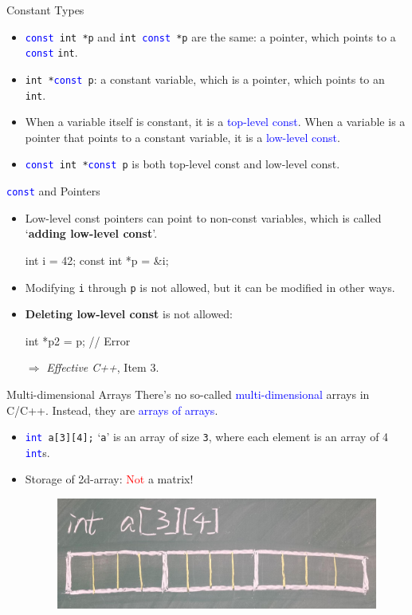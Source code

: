 \documentclass{beamer}
\newcommand{\red}[1]{\textcolor{red}{#1}}
\newcommand{\blue}[1]{\textcolor{blue}{#1}}
\newcommand{\ttt}[1]{\texttt{#1}}
\newcommand{\bluett}[1]{\blue{\ttt{#1}}}
\begin{document}
\begin{frame}{Constant Types}
	\begin{itemize}
		\item \bluett{const }\ttt{int *p} and \ttt{int }\bluett{const }\ttt{*p} are the same: a pointer, which points to a \bluett{const} \ttt{int}.
		\item \ttt{int *}\bluett{const }\ttt{p}: a constant variable, which is a pointer, which points to an \ttt{int}.
		\pause
		\item When a variable itself is constant, it is a \blue{top-level const}. When a variable is a pointer that points to a constant variable, it is a \blue{low-level const}.
		\item \bluett{const }\ttt{int *}\bluett{const }\ttt{p} is both top-level const and low-level const.
	\end{itemize}
\end{frame}

\begin{frame}[fragile]{\bluett{const} and Pointers}
	\begin{itemize}
		\item Low-level const pointers can point to non-const variables, which is called `\textbf{adding low-level const}'.
		\begin{cpp}
int i = 42;
const int *p = &i;
		\end{cpp}
		\item Modifying \ttt{i} through \ttt{p} is not allowed, but it can be modified in other ways.
		\pause
		\item \textbf{Deleting low-level const} is not allowed:
		\begin{cpp}
int *p2 = p; // Error
		\end{cpp}
		\pause
		\item[\(\Rightarrow\)] \textit{Effective C++}, Item 3.
	\end{itemize}
\end{frame}

\begin{frame}{Multi-dimensional Arrays}
	There's no so-called \blue{multi-dimensional} arrays in C/C++. Instead, they are \blue{arrays of arrays}.
	\begin{itemize}
		\item \bluett{int }\ttt{a[3][4];} `\ttt{a}' is an array of size \ttt{3}, where each element is an array of 4 \bluett{int}s.
		\pause
		\item Storage of 2d-array: \red{Not} a matrix!
		\begin{figure}[h]
			\centering
			\includegraphics[scale=0.2]{figures/2darray.jpg}
		\end{figure}
	\end{itemize}
\end{frame}
\end{document}
